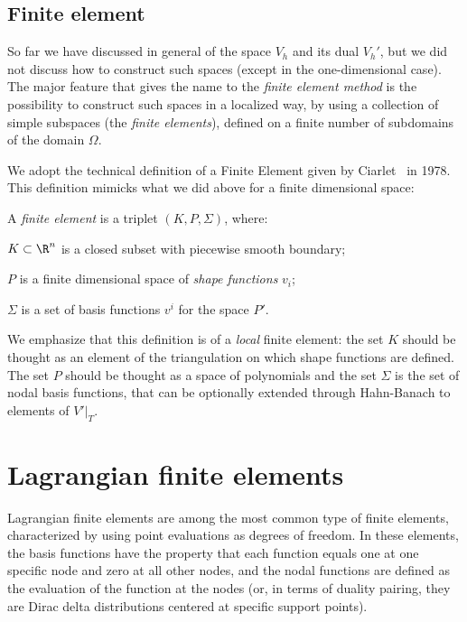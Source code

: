 \subsection{Finite element}

So far we have discussed in general of the space $V_h$ and its dual $V_h'$, but we did not discuss how to construct such spaces (except in the one-dimensional case). The major feature that gives the name to the \emph{finite element method} is the possibility to construct such spaces in a localized way, by using a collection of simple subspaces (the \emph{finite elements}), defined on a finite number of subdomains of the domain $\Omega$.

We adopt the technical definition of a Finite Element given by
Ciarlet~\cite{ciarlet78} in 1978. This definition mimicks what we did above for
a finite dimensional space:
\begin{definition}[Ciarlet, 1978] 
A \emph{finite element} is a triplet $(K,P,\Sigma)$, where:
\begin{romanlist}
\item $K\subset \R^n$ is a closed subset with piecewise smooth boundary;
\item $P$ is a finite dimensional space of \emph{shape functions} $v_i$;
\item $\Sigma$ is a set of basis functions $v^i$ for the space $P'$.
\end{romanlist}
\end{definition}

We emphasize that this definition is of a \emph{local} finite element: the set $K$ should be thought as an element of the triangulation on which shape functions are defined. The set $P$ should be thought as a space of polynomials and the set $\Sigma$ is the set of nodal basis functions, that can be optionally extended through Hahn-Banach to elements of $V'|_T$.

\section{Lagrangian finite elements}

Lagrangian finite elements are among the most common type of finite elements, characterized by using point evaluations as degrees of freedom. In these elements, the basis functions have the property that each function equals one at one specific node and zero at all other nodes, and the nodal functions are defined as the evaluation of the function at the nodes (or, in terms of duality pairing, they are Dirac delta distributions centered at specific support points).

